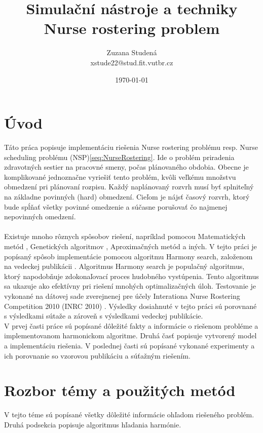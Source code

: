 \documentclass[a4paper, 14pt]{article}
\begin{document}
\title{Simulační nástroje a techniky\\
Nurse rostering problem}
\author{Zuzana Studená\\ 
xstude22@stud.fit.vutbr.cz}
\date{\today}

\maketitle

\section{Úvod}

Táto práca popisuje implementáciu riešenia Nurse rostering problému resp. Nurse scheduling problému (NSP)\ref{seq:NurseRostering}. Ide o problém priradenia zdravotných sestier na pracovné smeny, počas plánovaného obdobia. Obecne je komplikované jednoznačne vyriešiť tento problém, kvôli veľkému množstvu obmedzení pri plánovaní rozpisu. Každý naplánovaný rozvrh musí byť splniteľný na základne povinných (hard) obmedzení. Cieľom je nájsť časový rozvrh, ktorý bude spĺňať všetky povinné omedzenie a súčasne porušovať čo najmenej nepovinných omedzení.\\
\\
Existuje mnoho rôznych spôsobov riešení, napríklad pomocou Matematických metód \cite{Math}, Genetických algoritmov \cite{Gen}, Aproximačných metód\cite{Apr} a iných. V tejto práci je popísaný spôsob implementácie pomocou algoritmu Harmony search, založenom na vedeckej publikácii \cite{MainArticle}. Algoritmus Harmony search\cite{HarmonySearch} je populačný algoritmus, ktorý napodobňuje zdokonaľovací proces hudobného vystúpenia. Tento algoritmus sa ukazuje ako efektívny pri riešení mnohých optimalizačných úloh. Testovanie je vykonané na dátovej sade zverejnenej pre účely Interationa Nurse Rostering Competition 2010 (INRC 2010) \cite{PATAT}. Výsledky dosiahnuté v tejto práci sú porovnané s výsledkami sútaže a zároveň s výsledkami vedeckej publikácie. \\

V prvej časti práce sú popísané dôležité fakty a informácie o riešenom probléme a implementovanom harmonickom algoritme. Druhá časť popisuje vytvorený model a implementáciu riešenia. V poslednej časti sú popísané vykonané experimenty a ich porovnanie so vzorovou publikáciu a súťažným riešením. \\


\section{Rozbor témy a použitých metód}
V tejto téme sú popísané všetky dôležité informácie ohľadom riešeného problém. Druhá podsekcia popisuje algoritmus hľadania harmónie. 
\end{document}
